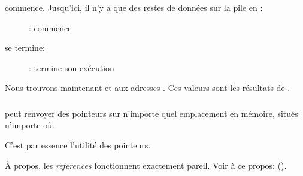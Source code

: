 \clearpage
\ttfone commence.
Jusqu'ici, il n'y a que des restes de données sur la pile en \PtrsAddresses :

\begin{figure}[H]
\centering
{}
\caption{\olly: \ttfone commence}
\label{fig:pointers_olly_stk_2}
\end{figure}

\clearpage
\ttfone se termine:

\begin{figure}[H]
\centering
{}
\caption{\olly: \ttfone termine son exécution}
\label{fig:pointers_olly_stk_3}
\end{figure}

Nous trouvons maintenant  et  aux adresses \PtrsAddresses.
Ces valeurs sont les résultats de \ttfone.

\subsubsection{\Conclusion{}}
 
\ttfone peut renvoyer des pointeurs sur n'importe quel emplacement en mémoire, situés
n'importe où.

C'est par essence l'utilité des pointeurs.

À propos, les \emph{references} \Cpp fonctionnent exactement pareil. Voir à ce propos:
().
